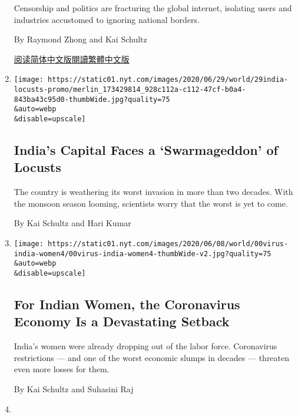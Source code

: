 \begin{enumerate}
  Censorship and politics are fracturing the global internet, isolating
  users and industries accustomed to ignoring national borders.

  By Raymond Zhong and Kai Schultz

  \href{https://cn.nytimes.com/technology/20200701/india-china-tiktok/}{阅读简体中文版}\href{https://cn.nytimes.com/technology/20200701/india-china-tiktok/zh-hant/}{閱讀繁體中文版}
\item
  \href{/2020/06/29/world/asia/india-new-delhi-locusts.html}{}

  \texttt{[image: https://static01.nyt.com/images/2020/06/29/world/29india-locusts-promo/merlin\_173429814\_928c112a-c112-47cf-b0a4-843ba43c95d0-thumbWide.jpg?quality=75\\\&auto=webp\\\&disable=upscale]}

  \hypertarget{indias-capital-faces-a-swarmageddon-of-locusts}{%
  \subsection{India's Capital Faces a `Swarmageddon' of
  Locusts}\label{indias-capital-faces-a-swarmageddon-of-locusts}}

  The country is weathering its worst invasion in more than two decades.
  With the monsoon season looming, scientists worry that the worst is
  yet to come.

  By Kai Schultz and Hari Kumar
\item
  \href{/2020/06/09/world/asia/india-coronavirus-women-economy.html}{}

  \texttt{[image: https://static01.nyt.com/images/2020/06/08/world/00virus-india-women4/00virus-india-women4-thumbWide-v2.jpg?quality=75\\\&auto=webp\\\&disable=upscale]}

  \hypertarget{for-indian-women-the-coronavirus-economy-is-a-devastating-setback}{%
  \subsection{For Indian Women, the Coronavirus Economy Is a Devastating
  Setback}\label{for-indian-women-the-coronavirus-economy-is-a-devastating-setback}}

  India's women were already dropping out of the labor force.
  Coronavirus restrictions --- and one of the worst economic slumps in
  decades --- threaten even more losses for them.

  By Kai Schultz and Suhasini Raj
\item
  \href{/2020/06/03/world/asia/cyclone-nisarga-india-mumbai.html}{}


\end{enumerate}
